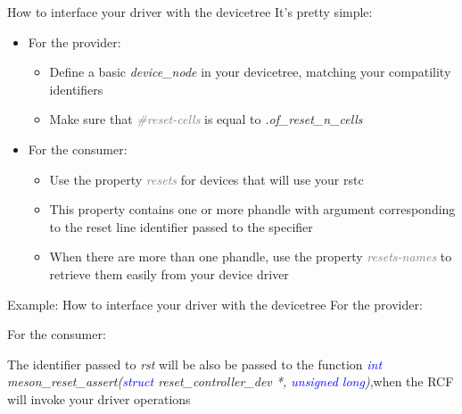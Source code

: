 \documentclass{beamer}
\begin{document}
\begin{frame}{How to interface your driver with the devicetree}
	It's pretty simple:
	\begin{itemize}
		\item For the provider:
		\begin{itemize}
			\item Define a basic \textit{device\_node} in your devicetree, matching your compatility identifiers
			\item Make sure that \textit{\textcolor{gray}{\#reset-cells}} is equal to \textit{.of\_reset\_n\_cells}
		\end{itemize}
		\item For the consumer:
		\begin{itemize}
			\item Use the property \textit{\textcolor{gray}{resets}} for devices that will use your rstc
			\item This property contains one or more phandle with argument corresponding to the reset line identifier passed to the specifier
			\item When there are more than one phandle, use the property \textit{\textcolor{gray}{resets-names}} to retrieve them easily from your device driver
		\end{itemize}
	\end{itemize}
\end{frame}

\begin{frame}{Example: How to interface your driver with the devicetree}
	For the provider:
	
	For the consumer:
	
	The identifier passed to \textit{rst} will be also be passed to the function \newline\textit{\textcolor{blue}{int} meson\_reset\_assert(\textcolor{blue}{struct} reset\_controller\_dev *, \textcolor{blue}{unsigned long})},\newline when the RCF will invoke your driver operations
\end{frame}
\end{document}
